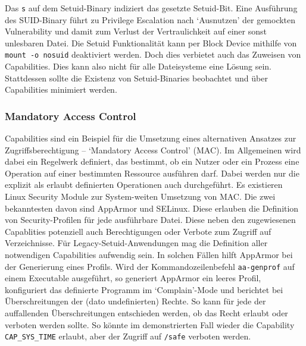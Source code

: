 Das \texttt{s} auf dem Setuid-Binary indiziert das gesetzte Setuid-Bit. Eine Ausführung des SUID-Binary führt zu Privilege Escalation nach `Ausnutzen' der gemockten Vulnerability und damit zum Verlust der Vertraulichkeit auf einer sonst unlesbaren Datei. Die Setuid Funktionalität kann per Block Device mithilfe von \texttt{mount -o nosuid} deaktiviert werden. Doch dies verbietet auch das Zuweisen von Capabilities. Dies kann also nicht für alle Dateisysteme eine Lösung sein. Stattdessen sollte
die Existenz von Setuid-Binaries beobachtet und über Capabilities minimiert werden.

\subsubsection{Mandatory Access Control}

Capabilities sind ein Beispiel für die Umsetzung eines alternativen Ansatzes zur Zugriffsberechtigung -- `Mandatory Access Control' (MAC). Im Allgemeinen wird dabei ein Regelwerk definiert, das bestimmt, ob ein Nutzer oder ein Prozess eine Operation auf einer bestimmten Ressource ausführen darf. Dabei werden nur die explizit als erlaubt definierten Operationen auch durchgeführt. Es existieren Linux Security Module zur System-weiten Umsetzung von MAC. Die zwei bekanntesten davon
sind AppArmor und SELinux. Diese erlauben die Definition von Security-Profilen für jede ausführbare Datei. Diese neben den zugewiesenen Capablities potenziell auch Berechtigungen oder Verbote zum Zugriff auf Verzeichnisse. Für Legacy-Setuid-Anwendungen mag die Definition aller notwendigen Capabilities aufwendig sein. In solchen Fällen hilft AppArmor bei der Generierung eines Profils. Wird der Kommandozeilenbefehl \texttt{aa-genprof} auf einem Executable ausgeführt, so generiert
AppArmor ein leeres Profil, konfiguriert das definierte Programm im `Complain'-Mode und berichtet bei Überschreitungen der (dato undefinierten) Rechte. So kann für jede der auffallenden Überschreitungen entschieden werden, ob das Recht erlaubt oder verboten werden sollte. So könnte im demonstrierten Fall wieder die Capability \texttt{CAP\_SYS\_TIME} erlaubt, aber der Zugriff auf \texttt{/safe} verboten werden.

